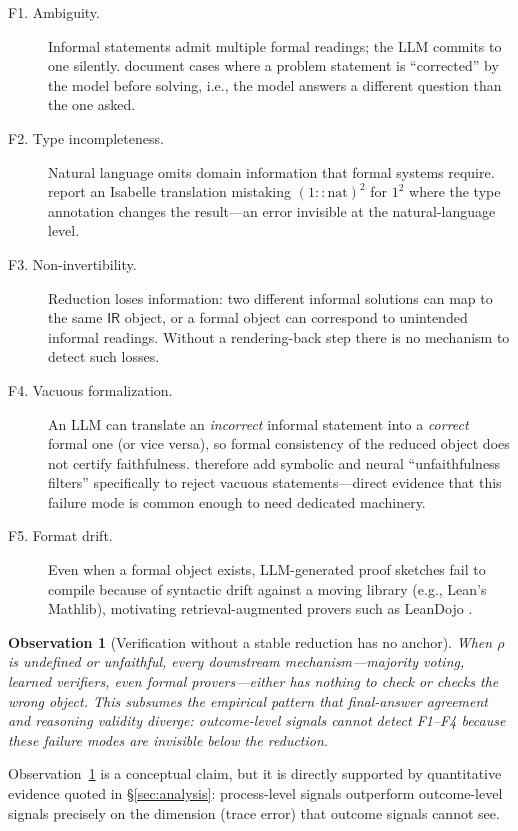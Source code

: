 \documentclass[11pt,a4paper]{article}
\newtheorem{observation}{Observation}
\newcommand{\ir}{\mathsf{IR}}
\begin{document}
\begin{description}
  \item[F1. Ambiguity.] Informal statements admit multiple formal readings; the LLM commits to one silently. \citet{frieder2023chatgpt} document cases where a problem statement is ``corrected'' by the model before solving, i.e., the model answers a different question than the one asked.
  \item[F2. Type incompleteness.] Natural language omits domain information that formal systems require. \citet{zhou2024dtv} report an Isabelle translation mistaking $(1::\mathrm{nat})^2$ for $1^2$ where the type annotation changes the result---an error invisible at the natural-language level.
  \item[F3. Non-invertibility.] Reduction loses information: two different informal solutions can map to the same $\ir$ object, or a formal object can correspond to unintended informal readings. Without a rendering-back step there is no mechanism to detect such losses.
  \item[F4. Vacuous formalization.] An LLM can translate an \emph{incorrect} informal statement into a \emph{correct} formal one (or vice versa), so formal consistency of the reduced object does not certify faithfulness. \citet{zhou2024dtv} therefore add symbolic and neural ``unfaithfulness filters'' specifically to reject vacuous statements---direct evidence that this failure mode is common enough to need dedicated machinery.
  \item[F5. Format drift.] Even when a formal object exists, LLM-generated proof sketches fail to compile because of syntactic drift against a moving library (e.g., Lean's Mathlib), motivating retrieval-augmented provers such as LeanDojo \citep{yang2023leandojo}.
\end{description}

\begin{observation}[Verification without a stable reduction has no anchor]\label{obs:anchor}
When $\rho$ is undefined or unfaithful, every downstream mechanism---majority voting, learned verifiers, even formal provers---either has nothing to check or checks the wrong object. This subsumes the empirical pattern that final-answer agreement and reasoning validity diverge: outcome-level signals cannot detect F1--F4 because these failure modes are invisible below the reduction.
\end{observation}

Observation~\ref{obs:anchor} is a conceptual claim, but it is directly supported by quantitative evidence quoted in \S\ref{sec:analysis}: process-level signals outperform outcome-level signals precisely on the dimension (trace error) that outcome signals cannot see.
\end{document}
